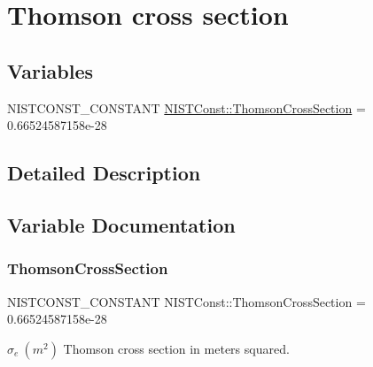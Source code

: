 \hypertarget{group___n_i_s_t_const-_thomson}{}\section{Thomson cross section}
\label{group___n_i_s_t_const-_thomson}
\subsection*{Variables}
\begin{DoxyCompactItemize}
\item 
N\+I\+S\+T\+C\+O\+N\+S\+T\+\_\+\+C\+O\+N\+S\+T\+A\+NT \mbox{\hyperlink{group___n_i_s_t_const-_thomson_gab8adbacb38cef2b9b883e8bbe6a4b524}{N\+I\+S\+T\+Const\+::\+Thomson\+Cross\+Section}} = 0.\+66524587158e-\/28
\end{DoxyCompactItemize}


\subsection{Detailed Description}


\subsection{Variable Documentation}
\mbox{\label{group___n_i_s_t_const-_thomson_gab8adbacb38cef2b9b883e8bbe6a4b524}} 
\subsubsection{\texorpdfstring{Thomson\+Cross\+Section}{ThomsonCrossSection}}
{\footnotesize\ttfamily N\+I\+S\+T\+C\+O\+N\+S\+T\+\_\+\+C\+O\+N\+S\+T\+A\+NT N\+I\+S\+T\+Const\+::\+Thomson\+Cross\+Section = 0.\+66524587158e-\/28}

$\sigma_e \ (m^2)$ Thomson cross section in meters squared. 